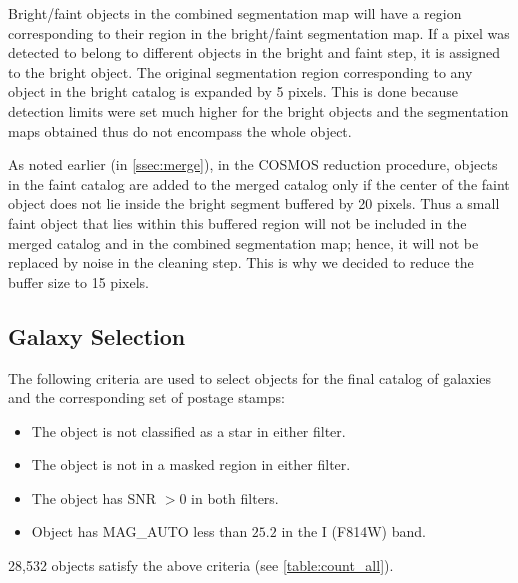 \documentclass[a4paper,11pt]{article}
\begin{document}
Bright/faint objects in the combined segmentation map will have a region corresponding to their region in the bright/faint segmentation map. If a pixel was detected to belong to different objects in the bright and faint step, it is assigned to the bright object. The original segmentation region corresponding to any object in the bright catalog is expanded by 5 pixels. This is done because detection limits were set much higher for the bright objects and the segmentation maps obtained thus do not encompass the whole object. 

As noted earlier (in \autoref{ssec:merge}), in the COSMOS reduction procedure, objects in the faint catalog are added to the merged catalog only if the center of the faint object does not lie inside the bright segment buffered by 20 pixels. Thus a small faint object that lies within this buffered region will not be included in the merged catalog and in the combined segmentation map; hence, it will not be replaced by noise in the cleaning step. This is why we decided to reduce the buffer size to 15 pixels. 

\subsection{Galaxy Selection}
\label{sec:gal_selection}
The following criteria are used to  select objects for the final catalog of galaxies and the corresponding set of postage stamps:
\begin{itemize}
\item The object is not classified as a star in either filter.
\item The object is not in a masked region in either filter.
\item The object has SNR $>0$ in both filters.
\item Object has MAG\_AUTO less than $25.2$ in the I (F814W) band. 
\end{itemize}

28,532 objects satisfy the above criteria (see \autoref{table:count_all}).
\end{document}

